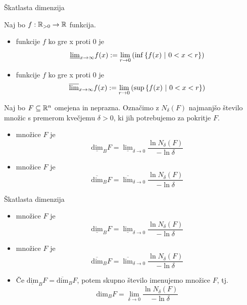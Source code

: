 \documentclass[10pt]{beamer}
\begin{document}
\begin{frame}[t]{Škatlasta dimenzija}
     {
        \begin{definicija}
            Naj bo \(f: \mathbb{R}_{>0} \to \mathbb{R}\) funkcija. 
            \begin{itemize}
                \item {} funkcije \(f\) ko gre x proti \(0\) je 
                \[\underline{\lim}_{x \to \infty} f(x) := \lim_{r \to 0} \left(\inf \left\{f(x) \ | \ 0< x < r\right\}\right)\]
                \item {} funkcije \(f\) ko gre x proti \(0\) je 
                \[\overline{\lim}_{x \to \infty} f(x) := \lim_{r \to 0} \left(\sup \left\{f(x) \ | \ 0< x < r\right\}\right)\]
            \end{itemize}
        \end{definicija}
    }

    \pause
    Naj bo \(F \subseteq \mathbb{R}^n\) omejena in neprazna. Označimo z \(N_\delta(F)\) najmanjšo število množic s premerom kvečjemu \(\delta>0\), ki jih potrebujemo za pokritje \(F\).
    
    \pause   
    \begin{definicija}
        \begin{itemize}
            \item {} množice \(F\) je 
            \[\underline{\text{dim}}_B F = \underline{\lim}_{\delta \to 0} \frac{\ln N_\delta(F)}{-\ln \delta}\]
            \item {} množice \(F\) je 
            \[\overline{\text{dim}}_B F = \overline{\lim}_{\delta \to 0} \frac{\ln N_\delta(F)}{-\ln \delta}\]
        \end{itemize}  
    \end{definicija}
\end{frame}

\begin{frame}[t]{Škatlasta dimenzija}  
    \begin{definicija}
        \begin{itemize}
            \item {} množice \(F\) je 
            \[\underline{\text{dim}}_B F = \underline{\lim}_{\delta \to 0} \frac{\ln N_\delta(F)}{-\ln \delta}\]
            \item {} množice \(F\) je 
            \[\overline{\text{dim}}_B F = \overline{\lim}_{\delta \to 0} \frac{\ln N_\delta(F)}{-\ln \delta}\]
            \item Če \(\underline{\text{dim}}_B F = \overline{\text{dim}}_B F\), potem skupno število imenujemo  množice \(F\), tj. 
            \[\text{dim}_B F = \lim_{\delta \to 0} \frac{\ln N_\delta(F)}{-\ln \delta}\]
        \end{itemize}  
    \end{definicija}
\end{frame}
\end{document}
